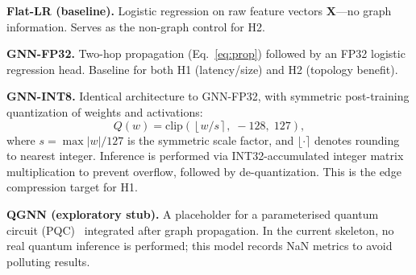 \documentclass[conference]{IEEEtran}
\begin{document}
\smallskip\noindent\textbf{Flat-LR (baseline).}  Logistic regression on raw
feature vectors $\mathbf{X}$---no graph information.  Serves as the non-graph
control for H2.

\smallskip\noindent\textbf{GNN-FP32.}  Two-hop propagation
(Eq.~\ref{eq:prop}) followed by an FP32 logistic regression head.  Baseline
for both H1 (latency/size) and H2 (topology benefit).

\smallskip\noindent\textbf{GNN-INT8.}  Identical architecture to GNN-FP32,
with symmetric post-training quantization of weights and activations:
\begin{equation}\label{eq:quant}
  Q(w) = \mathrm{clip}\!\left(\left\lfloor w / s \right\rceil,\; -128,\; 127\right),
\end{equation}
where $s = \max|w| / 127$ is the symmetric scale factor, and $\lfloor \cdot \rceil$ denotes rounding to nearest integer.  Inference is performed via
INT32-accumulated integer matrix multiplication to prevent overflow, followed
by de-quantization.  This is the edge compression target for H1.

\smallskip\noindent\textbf{QGNN (exploratory stub).}  A placeholder for a
parameterised quantum circuit (PQC)~\cite{farhi2018classification} integrated
after graph propagation.  In the current skeleton, no real quantum inference is
performed; this model records NaN metrics to avoid polluting results.
\end{document}
